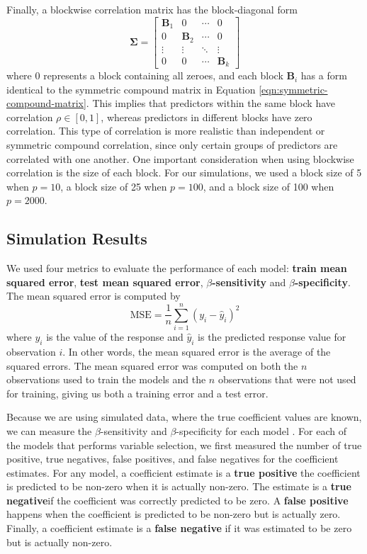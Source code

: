 \documentclass{article}
\begin{document}
Finally, a blockwise correlation matrix has the block-diagonal form
\begin{equation}
	\mathbf{\Sigma} = \begin{bmatrix}
		\mathbf{B}_1 & 0 & \cdots & 0 \\
		0 & \mathbf{B}_2 & \cdots & 0 \\
		\vdots & \vdots & \ddots & \vdots \\
		0 & 0 & \cdots & \mathbf{B}_k
	\end{bmatrix}
\end{equation}
where $0$ represents a block containing all zeroes, and each block $\mathbf{B}_i$ has a form identical to the symmetric compound matrix in Equation \ref{eqn:symmetric-compound-matrix}. This implies that predictors within the same block have correlation $\rho\in [0, 1]$, whereas predictors in different blocks have zero correlation. This type of correlation is more realistic than independent or symmetric compound correlation, since only certain groups of predictors are correlated with one another. One important consideration when using blockwise correlation is the size of each block. For our simulations, we used a block size of 5 when $p = 10$, a block size of 25 when $p = 100$, and a block size of 100 when $p = 2000$.

\subsection{Simulation Results}\label{sec:simulation-results}

We used four metrics to evaluate the performance of each model: \textbf{train mean squared error}, \textbf{test mean squared error}, \textbf{$\beta$-sensitivity} and \textbf{$\beta$-specificity}. The mean squared error is computed by
\begin{equation}
	\text{MSE} = \frac{1}{n}\sum\limits_{i = 1}^n (y_i - \hat{y}_i)^2
\end{equation}
where $y_i$ is the value of the response and $\hat{y}_i$ is the predicted response value for observation $i$. In other words, the mean squared error is the average of the squared errors. The mean squared error was computed on both the $n$ observations used to train the models and the $n$ observations that were not used for training, giving us both a training error and a test error.

Because we are using simulated data, where the true coefficient values are known, we can measure the $\beta$-sensitivity and $\beta$-specificity for each model \cite{liu2020logsum}. For each of the models that performs variable selection, we first measured the number of true positive, true negatives, false positives, and false negatives for the coefficient estimates. For any model, a coefficient estimate is a \textbf{true positive} the coefficient is predicted to be non-zero when it is actually non-zero. The estimate is a \textbf{true negative}if the coefficient was correctly predicted to be zero. A \textbf{false positive} happens when the coefficient is predicted to be non-zero but is actually zero. Finally, a coefficient estimate is a \textbf{false negative} if it was estimated to be zero but is actually non-zero.
\end{document}
